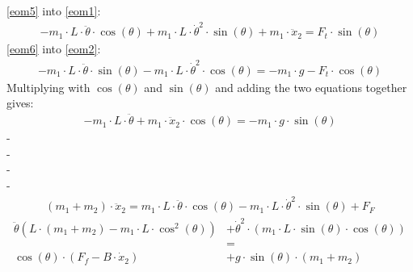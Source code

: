 \autoref{eom5} into \autoref{eom1}:
\begin{align}
-m_1\cdot L\cdot \ddot \theta \cdot \cos(\theta)+m_1 \cdot L\cdot \dot \theta^2 \cdot \sin(\theta)+m_1\cdot \ddot x_2 = F_t \cdot \sin(\theta) \label{eom7}
\end{align}
\autoref{eom6} into \autoref{eom2}:
\begin{align}
-m_1 \cdot L \cdot \ddot \theta\cdot\sin(\theta) - m_1 \cdot L\cdot \dot \theta^2\cdot \cos(\theta)=-m_1\cdot g - F_t \cdot \cos(\theta)\label{eom8}
\end{align}
Multiplying with $\cos(\theta)$ and $\sin(\theta)$ and adding the two equations together gives:
\begin{align}
-m_1\cdot L \cdot \ddot \theta + m_1\cdot \ddot x_2 \cdot \cos(\theta)=-m_1\cdot g\cdot \sin(\theta)
\end{align}
-\\
-\\
-\\
-\\
\begin{align}
(m_1+m_2)\cdot \ddot x_2=m_1\cdot L\cdot \ddot \theta \cdot \cos(\theta)-m_1\cdot L\cdot \dot \theta^2 \cdot \sin(\theta)+F_F
\end{align}
\begin{align}
\ddot \theta(L\cdot (m_1 + m_2)-m_1 \cdot L \cdot \cos^2(\theta))&+\dot\theta^2 \cdot (m_1\cdot L\cdot \sin(\theta)\cdot \cos(\theta))\\
&= \nonumber \\
\cos(\theta)\cdot (F_f-B\cdot \dot x_2)&+g\cdot \sin(\theta)\cdot (m_1+m_2)
\end{align}

